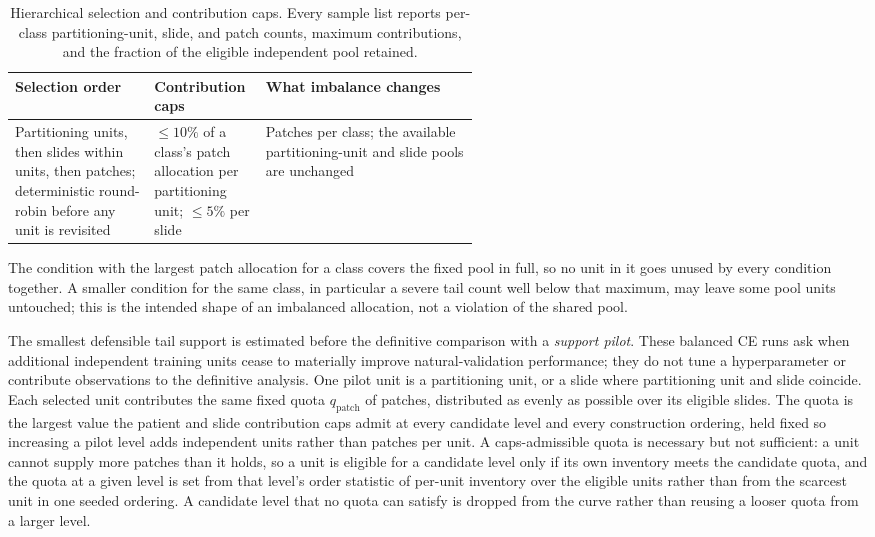 \documentclass[11pt]{article}
\begin{document}
\begin{table}[ht]
  \centering
  \footnotesize
  \begin{tabularx}{\linewidth}{@{}>{\raggedright\arraybackslash}p{0.30\linewidth}>{\raggedright\arraybackslash}p{0.24\linewidth}X@{}}
    \toprule
    Selection order & Contribution caps & What imbalance changes \\
    \midrule
    Partitioning units, then slides within units, then patches; deterministic round-robin before any unit is revisited & $\leq10\%$ of a class's patch allocation per partitioning unit; $\leq5\%$ per slide & Patches per class; the available partitioning-unit and slide pools are unchanged \\
    \bottomrule
  \end{tabularx}
  \caption{Hierarchical selection and contribution caps. Every sample list reports per-class partitioning-unit, slide, and patch counts, maximum contributions, and the fraction of the eligible independent pool retained.}
  \label{tab:support-rules}
\end{table}

\noindent The condition with the largest patch allocation for a class covers the fixed pool in full, so no unit in it goes unused by every condition together. A smaller condition for the same class, in particular a severe tail count well below that maximum, may leave some pool units untouched; this is the intended shape of an imbalanced allocation, not a violation of the shared pool.

The smallest defensible tail support is estimated before the definitive comparison with a \emph{support pilot}. These balanced CE runs ask when additional independent training units cease to materially improve natural-validation performance; they do not tune a hyperparameter or contribute observations to the definitive analysis. One pilot unit is a partitioning unit, or a slide where partitioning unit and slide coincide. Each selected unit contributes the same fixed quota $q_{\mathrm{patch}}$ of patches, distributed as evenly as possible over its eligible slides. The quota is the largest value the patient and slide contribution caps admit at every candidate level and every construction ordering, held fixed so increasing a pilot level adds independent units rather than patches per unit. A caps-admissible quota is necessary but not sufficient: a unit cannot supply more patches than it holds, so a unit is eligible for a candidate level only if its own inventory meets the candidate quota, and the quota at a given level is set from that level's order statistic of per-unit inventory over the eligible units rather than from the scarcest unit in one seeded ordering. A candidate level that no quota can satisfy is dropped from the curve rather than reusing a looser quota from a larger level.
\end{document}

